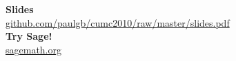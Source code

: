 \documentclass{beamer}
\theoremstyle{definition}
\theoremstyle{definition}
\begin{document}

\begin{frame}
\footnotesize
{}

\end{frame}


\begin{frame}
\textbf{Slides} \\
\url{github.com/paulgb/cumc2010/raw/master/slides.pdf} \\
\vspace{1.5em}
\textbf{Try Sage!} \\
\url{sagemath.org}
\end{frame}
\end{document}

